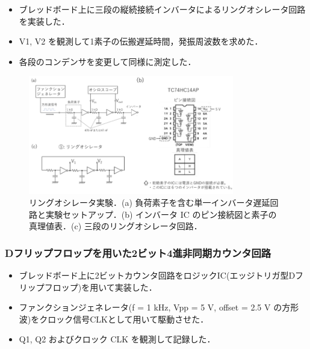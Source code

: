 \documentclass{ltjsarticle}
\begin{document}
\begin{itemize}
  \item ブレッドボード上に三段の縦続接続インバータによるリングオシレータ回路を実装した．
  \item V1, V2 を観測して1素子の伝搬遅延時間，発振周波数を求めた．
  \item 各段のコンデンサを変更して同様に測定した．
\end{itemize}

\begin{figure}[H]
  \centering
  \includegraphics[width=0.8\textwidth]{figs/RingOsilatorProcedure.png}
  \caption{リングオシレータ実験．(a) 負荷素子を含む単一インバータ遅延回路と実験セットアップ．(b) インバータ IC のピン接続図と素子の真理値表．(c) 三段のリングオシレータ回路．}
  \label{fig:ringosilator}
\end{figure}

\subsubsection{Dフリップフロップを用いた2ビット4進非同期カウンタ回路}
\begin{itemize}
  \item ブレッドボード上に2ビットカウンタ回路をロジックIC(エッジトリガ型Dフリップフロップ)を用いて実装した．
  \item ファンクションジェネレータ(f = 1 kHz, Vpp = 5 V, offset = 2.5 V の方形波)をクロック信号CLKとして用いて駆動させた．
  \item Q1, Q2 およびクロック CLK を観測して記録した．
\end{itemize}
\end{document}
